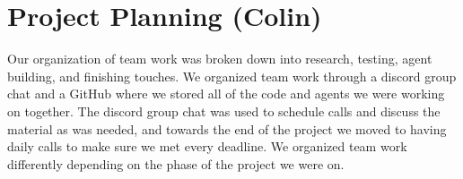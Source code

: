 \documentclass[article, 10pt]{IEEEtran}
\begin{document}
\section{Project Planning (Colin)}\label{sec:3_projectplanning}
Our organization of team work was broken down into research, testing, agent building, and finishing touches. We organized team work through a discord group chat and a GitHub where we stored all of the code and agents we were working on together. The discord group chat was used to schedule calls and discuss the material as was needed, and towards the end of the project we moved to having daily calls to make sure we met every deadline. We organized team work differently depending on the phase of the project we were on. 
\end{document}
